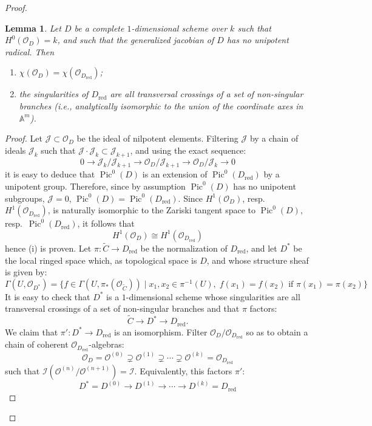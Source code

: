 \documentclass[10pt]{amsart}
\theoremstyle{plain}
\newtheorem{lemma}[theorem]{Lemma}
\theoremstyle{definition}
\DeclareMathOperator{\Pic}{Pic}
\DeclareMathOperator{\red}{red}
\newcommand{\cO}{\mathcal{O}}
\begin{document}
\begin{proof}
\begin{lemma}\label{lem:2.6}
Let $D$ be a complete $1$-dimensional scheme over $k$ such that $H^0(\cO_D) = k$, and such that the generalized jacobian of $D$ has no unipotent radical. Then
\begin{enumerate}
\item[(i)] $\chi(\cO_D) = \chi(\cO_{D_{\red}})$;
\item[(ii)] the singularities of $D_{\red}$ are all transversal crossings of a set of non-singular branches (i.e., analytically isomorphic to the union of the coordinate axes in $\mathbb{A}^m$).
\end{enumerate}
\end{lemma}

\begin{proof}
Let $\mathscr{J} \subset \cO_D$ be the ideal of nilpotent elements. Filtering $\mathscr{J}$ by a chain of ideals $\mathscr{J}_k$ such that $\mathscr{J} \cdot \mathscr{J}_k \subset \mathscr{J}_{k+1}$, and using the exact sequence:
\[
0 \longrightarrow \mathscr{J}_k/\mathscr{J}_{k+1} \longrightarrow \cO_D/\mathscr{J}_{k+1} \longrightarrow \cO_D/\mathscr{J}_k \longrightarrow 0
\]
it is easy to deduce that $\Pic^0(D)$ is an extension of $\Pic^0(D_{\red})$ by a unipotent group. Therefore, since by assumption $\Pic^0(D)$ has no unipotent subgroups, $\mathscr{J} = 0$, $\Pic^0(D) = \Pic^0(D_{\red})$. Since $H^1(\cO_D)$, resp.~$H^1(\cO_{D_{\red}})$, is naturally isomorphic to the Zariski tangent space to $\Pic^0(D)$, resp.~$\Pic^0(D_{\red})$, it follows that
\[
H^1(\cO_D) \cong H^1(\cO_{D_{\red}})
\]
hence (i) is proven. Let $\pi: \widetilde{C} \to D_{\red}$ be the normalization of $D_{\red}$, and let $D^*$ be the local ringed space which, as topological space is $D$, and whose structure sheaf is given by:
\[
\Gamma(U, \cO_{D^*}) = \{f \in \Gamma(U, \pi_*(\cO_{\widetilde{C}})) \mid x_1, x_2 \in \pi^{-1}(U), \; f(x_1) = f(x_2) \text{ if } \pi(x_1) = \pi(x_2)\}
\]
It is easy to check that $D^*$ is a $1$-dimensional scheme whose singularities are all transversal crossings of a set of non-singular branches and that $\pi$ factors:
\[
\widetilde{C} \longrightarrow D^* \longrightarrow D_{\red}.
\]
We claim that $\pi': D^* \to D_{\red}$ is an isomorphism. Filter $\cO_D/\cO_{D_{\red}}$ so as to obtain a chain of coherent $\cO_{D_{\red}}$-algebras:
\[
\cO_D = \cO^{(0)} \supsetneq \cO^{(1)} \supsetneq \cdots \supsetneq \cO^{(k)} = \cO_{D_{\red}}
\]
such that $\mathcal{I}(\cO^{(n)}/\cO^{(n+1)}) = \mathcal{I}$. Equivalently, this factors $\pi'$:
\[
D^* = D^{(0)} \to D^{(1)} \to \cdots \to D^{(k)} = D_{\red}
\]
\end{proof}
\end{proof}
\end{document}
